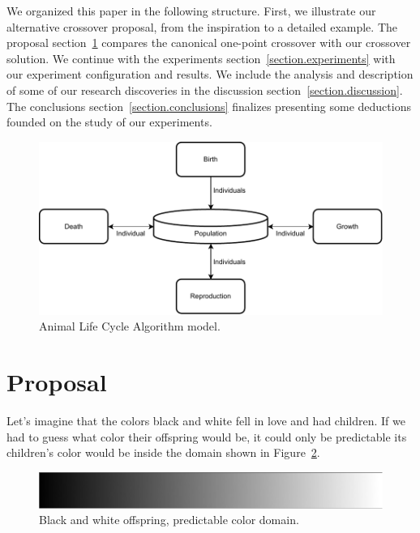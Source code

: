 \documentclass[graybox]{svmult}
\begin{document}
    We organized this paper in the following structure. First, we illustrate our alternative crossover proposal, from the inspiration to a detailed example. The proposal section~\ref{section.proposal} compares the canonical one-point crossover with our crossover solution. We continue with the experiments section~\ref{section.experiments} with our experiment configuration and results. We include the analysis and description of some of our research discoveries in the discussion section~\ref{section.discussion}. The conclusions section~\ref{section.conclusions} finalizes presenting some deductions founded on the study of our experiments.


    \begin{figure}[!ht]
        \centering
        \includegraphics[width=0.90\linewidth]{img/fig_algorithm_model.pdf}
        \caption{Animal Life Cycle Algorithm model\cite{Felix-Saul2023}.} \label{fig.algorithm_model}
        \end{figure}


\section{Proposal}
    \label{section.proposal}

    Let's imagine that the colors black and white fell in love and had children. If we had to guess what color their offspring would be, it could only be predictable its children's color would be inside the domain shown in Figure~\ref{fig.grayscale_continuous}.

    \begin{figure}[!ht]
        \centering
        \includegraphics[width=0.80\linewidth]{img/fig_grayscale_continuous.pdf}
        \caption{Black and white offspring, predictable color domain.} \label{fig.grayscale_continuous}
        \end{figure}
\end{document}
